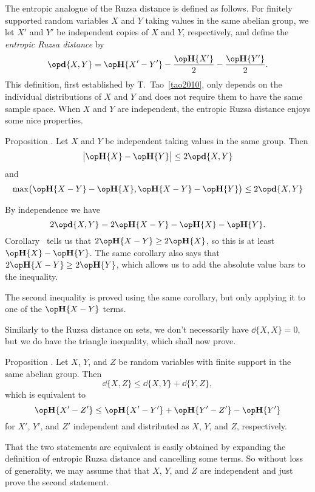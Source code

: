 The entropic analogue of the Ruzsa distance is defined as follows.
For finitely supported random variables $X$ and $Y$ taking values in the same abelian group,
we let $X'$ and $Y'$ be independent copies of $X$
and $Y$, respectively, and define the {\it entropic Ruzsa distance} by
$$\dd\{X,Y\} = \Eta\{X'-Y'\} - {\Eta\{X'\} \over 2} - {\Eta\{Y'\}\over 2}.$$
This definition, first established by T.~Tao~\ref{tao2010},
only depends on the individual distributions of $X$ and $Y$ and does not require them to
have the same sample space. When $X$ and $Y$ are independent, the entropic Ruzsa distance enjoys some
nice properties.

\edef\propabsdist{\the\sectcount.\the\thmcount}
\proclaim Proposition \advthm. Let $X$ and $Y$ be independent taking values in the same group. Then
$$\bigl| \Eta\{X\} - \Eta\{Y\} \bigr| \le 2\dd\{X,Y\}$$
and
$$\max\bigl( \Eta\{X-Y\} - \Eta\{X\}, \Eta\{X-Y\} - \Eta\{Y\} \bigr) \le 2\dd\{X,Y\}$$

\proof By independence we have
$$2\dd\{X,Y\} = 2\Eta\{X-Y\} - \Eta\{X\} - \Eta\{Y\}.$$
Corollary~{\cormaxsumineq} tells us that $2\Eta\{X-Y\} \ge 2\Eta\{X\}$, so this is at least $\Eta\{X\}-\Eta\{Y\}$.
The same corollary also says that $2\Eta\{X-Y\} \ge 2\Eta\{Y\}$, which allows us to add the absolute value bars
to the inequality.

The second inequality is proved using the same corollary, but only applying it to one of the $\Eta\{X-Y\}$
terms.\slug

Similarly to the Ruzsa distance on sets, we don't necessarily have $\dd\{X,X\} = 0$, but we do have
the triangle inequality, which shall now prove.

\proclaim Proposition \advthm. Let $X$, $Y$, and $Z$ be random variables with finite support in the same
abelian group. Then
$$\dd\{X,Z\} \le \dd\{X,Y\} + \dd\{Y,Z\},$$
which is equivalent to
$$\Eta\{X'-Z'\} \le \Eta\{X'-Y'\} + \Eta\{Y'-Z'\} - \Eta\{Y'\}$$
for $X'$, $Y'$, and $Z'$ independent and distributed as $X$, $Y$, and $Z$, respectively.

\proof That the two statements are equivalent is easily obtained by expanding the definition of
entropic Ruzsa distance and cancelling some terms. So without loss of generality, we may assume that
that $X$, $Y$, and $Z$ are independent and just prove the second statement.

